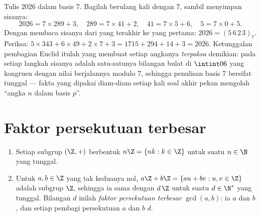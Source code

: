 \begin{example}\label{ex:b1:arith:base7}
Tulis $2026$ dalam basis $7$. Bagilah berulang kali dengan $7$, sambil menyimpan
sisanya:
\[
2026 = 7 \times 289 + 3, \quad
289 = 7 \times 41 + 2, \quad
41 = 7 \times 5 + 6, \quad
5 = 7 \times 0 + 5 .
\]
Dengan membaca sisanya dari yang terakhir ke yang pertama: $2026 =
(5\,6\,2\,3)_7$. Periksa: $5 \times 343 + 6 \times 49 + 2 \times 7
+ 3 = 1715 + 294 + 14 + 3 = 2026$. Ketunggalan pembagian Euclid
itulah yang membuat setiap angkanya \emph{terpaksa} demikian: pada setiap
langkah sisanya adalah satu-satunya bilangan bulat di $\intint06$ yang kongruen
dengan nilai berjalannya modulo $7$, sehingga penulisan basis $7$ bersifat tunggal ---
fakta yang dipakai diam-diam setiap kali soal akhir pekan mengolah
``angka $n$ dalam basis $p$''.
\end{example}

\section{Faktor persekutuan terbesar}

\begin{theorem}\label{thm:b1:arith:gcd}
\begin{enumerate}
  \item Setiap subgrup $(\Z, +)$ berbentuk $n\Z = \{nk : k
        \in \Z\}$ untuk suatu $n \in \N$ yang tunggal.
  \item Untuk $a, b \in \Z$ yang tak keduanya nol,  $a\Z + b\Z = \{au +
        bv : u, v \in \Z\}$ adalah subgrup $\Z$, sehingga ia sama dengan
        $d\,\Z$ untuk suatu $d \in \N^*$ yang tunggal. Bilangan $d$ inilah
        \emph{faktor persekutuan terbesar}
        $\gcd(a, b)$: ia  $a$ dan $b$, dan setiap pembagi
        persekutuan $a$ dan $b$  $d$.
\end{enumerate}
\end{theorem}

